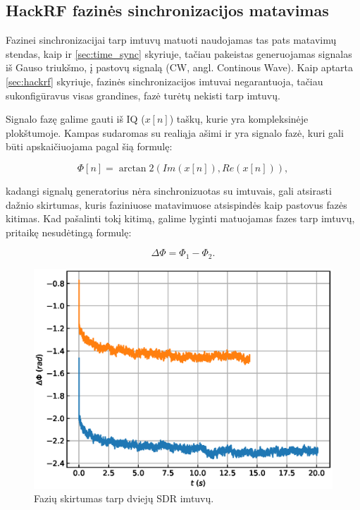 \documentclass[main.tex]{subfiles}
\begin{document}
\subsection{HackRF fazinės sinchronizacijos matavimas}

Fazinei sinchronizacijai tarp imtuvų matuoti naudojamas tas pats matavimų stendas,
kaip ir \ref{sec:time_sync} skyriuje, tačiau pakeistas generuojamas
signalas iš Gauso triukšmo, į pastovų signalą (CW, angl. Continous Wave).
Kaip aptarta \ref{sec:hackrf} skyriuje, fazinės sinchronizacijos
imtuvai negarantuoja, tačiau sukonfigūravus visas grandines,
fazė turėtų nekisti tarp imtuvų.

Signalo fazę galime gauti iš IQ ($x[n]$) taškų, kurie yra kompleksinėje plokštumoje. Kampas
sudaromas su realiąja ašimi ir yra signalo fazė, kuri gali būti apskaičiuojama pagal šią
formulę:

\begin{equation}
    \Phi[n] = \arctan2(Im(x[n]), Re(x[n])),
\end{equation}

\noindent kadangi signalų generatorius nėra sinchronizuotas su imtuvais, gali atsirasti
dažnio skirtumas, kuris faziniuose matavimuose atsispindės kaip pastovus fazės kitimas.
Kad pašalinti tokį kitimą, galime lyginti matuojamas fazes tarp imtuvų, pritaikę nesudėtingą
formulę:

\begin{equation}
    \Delta \Phi = \Phi_1 - \Phi_2.
\end{equation}

\begin{figure}[h]
    \begin{centering}
    \includegraphics[scale=1.0]{drawings/phase_sync}
    \par\end{centering}
    \protect\caption{\label{fig:phase_sync_result}Fazių skirtumas tarp dviejų SDR imtuvų.}
\end{figure}
\end{document}

